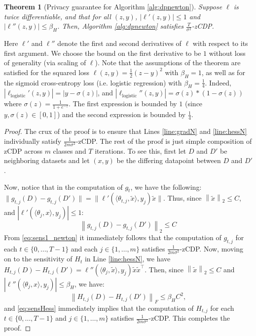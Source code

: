 \documentclass[letterpaper]{article} \usepackage{fullpage}
\newtheorem{thm}[lem]{Theorem}
\newcommand{\ltwo}[1]{\left\|#1\right\|_2}
\begin{document}
\begin{thm}[Privacy guarantee for Algorithm \ref{alg:dpnewton}]
Suppose $\ell$ is twice differentiable, and that for all $(z,y)$, $|\ell'(z, y)|\le 1$ and $|\ell''(z, y)|\le \beta_H$. Then, Algorithm \ref{alg:dpnewton} satisfies $\frac{T}{\sigma^2}$-zCDP.
\end{thm}

Here $\ell'$ and $\ell''$ denote the first and second derivatives of $\ell$ with respect to its first argument. We choose the bound on the first derivative to be $1$ without loss of generality (via scaling of $\ell$). Note that the assumptions of the theorem are satisfied for the squared loss $\ell(z, y) = \frac{1}{2}(z-y)^2$ with $\beta_H = 1$, as well as for the sigmoid cross-entropy loss (i.e. logistic regression) with $\beta_H = \frac{1}{4}$. Indeed, $|\ell_\text{logistic}'(z, y)| = |y - \sigma(z)|$, and $|\ell_\text{logistic}''(z, y)| = \sigma(z) * (1 - \sigma(z))$ where $\sigma(z) = \frac{1} {1 + e^{-z}}$. The first expression is bounded by $1$ (since $y, \sigma(z) \in [0, 1]$) and the second expression is bounded by $\frac{1}{4}$.

\begin{proof}
The crux of the proof is to ensure that Lines \ref{line:gradN} and \ref{line:hessN} individually satisfy $\frac{1}{2m\sigma^2}$-zCDP. The rest of the proof is just simple composition of zCDP \cite{bun2016concentrated} across $m$ classes and $T$ iterations. To see this, first let $D$ and $D'$ be neighboring datasets and let $(x,y)$ be the differing datapoint between $D$ and $D'$. 

Now, notice that in the computation of $g_t$, we have the following: $\|g_{t,j}(D) - g_{t,j}(D')\| = \|\ell'(\langle \theta_{t,j}, \tilde x\rangle, y_j)\tilde x\|$. Thus, since $\ltwo{\tilde x}\le C$, and $|\ell'(\langle \theta_j ,x\rangle, y_j)| \leq 1$:
\begin{equation}
    \ltwo{g_{t,j}(D)-g_{t,j}(D')}\leq {C}
    \label{eq:sens1_newton}
\end{equation}
From \eqref{eq:sens1_newton} it immediately follows that the computation of $g_{t,j}$ for each $t\in\{0,\ldots,T-1\}$ and each $j \in \{1, \dots, m\}$ satisfies $\frac{1}{2m\sigma^2}$-zCDP. Now, moving on to the sensitivity of $H_t$ in Line \ref{line:hessN}, we have $H_{t,j}(D)-H_{t,j}(D')=\ell''(\langle\theta_j, \tilde x\rangle, y_j)  \tilde x\tilde x^\top$. Then, since $\ltwo{\tilde x}\leq C$ and $|\ell''(\langle \theta_j ,x\rangle, y_j)|\le \beta_H$, we have:
\begin{equation}
    \left\|H_{t,j}(D)-H_{t,j}(D')\right\|_F\leq \beta_H C^2,
    \label{eq:sensHess}
\end{equation}
and \eqref{eq:sensHess} immediately implies that the computation of $H_{t,j}$ for each $t\in\{0,\ldots,T-1\}$ and $j \in \{1, \dots, m\}$ satisfies $\frac{1}{2m\sigma^2}$-zCDP. This completes the proof.
\end{proof}
\end{document}
